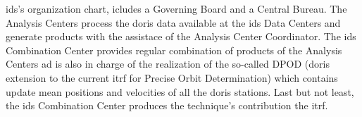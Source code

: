 \gls{ids}'s organization chart, icludes a Governing Board and a Central Bureau.
The Analysis Centers process the \gls{doris} data available at the \gls{ids} Data 
Centers and generate products with the assistace of the Analysis Center Coordinator.
The \gls{ids} Combination Center provides regular combination of products of 
the Analysis Centers ad is also in charge of the realization of the so-called 
DPOD (\gls{doris} extension to the current \gls{itrf} for Precise Orbit Determination) 
which contains update mean positions and velocities of all the \gls{doris} stations. 
Last but not least, the \gls{ids} Combination Center produces the technique's 
contribution the \gls{itrf}.

\iffalse
\fi
